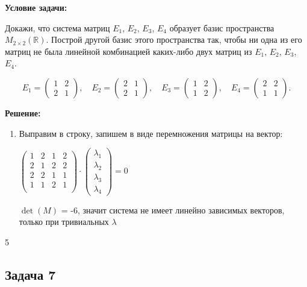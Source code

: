 \documentclass[a4paper,12pt]{article}
\begin{document}
\textbf{Условие задачи:}

Докажи, что система матриц $E_1$, $E_2$, $E_3$, $E_4$ образует базис пространства $M_{2 \times 2}(\mathbb{R})$. Построй другой базис этого пространства так, чтобы ни одна из его матриц не была линейной комбинацией каких-либо двух матриц из $E_1$, $E_2$, $E_3$, $E_4$.

\[
E_1 = \begin{pmatrix}1 & 2 \\ 2 & 1\end{pmatrix},\quad
E_2 = \begin{pmatrix}2 & 1 \\ 2 & 1\end{pmatrix},\quad
E_3 = \begin{pmatrix}1 & 2 \\ 1 & 2\end{pmatrix},\quad
E_4 = \begin{pmatrix}2 & 2 \\ 1 & 1\end{pmatrix}.
\]

\textbf{Решение:}
\begin{enumerate}
    \item Выправим в строку, запишем в виде перемножения матрицы на вектор: 
    
    $\begin{pmatrix}1 & 2 & 1 & 2\\
                    2 & 1 & 2 & 2\\
                    2 & 2 & 1 & 1\\
                    1 & 1 & 2 & 1\\\end{pmatrix} \cdot 
                    \begin{pmatrix}\lambda_1\\\lambda_2\\\lambda_3\\\lambda_4 \end{pmatrix}=0$

                    
    $\det(M)$ = -6, значит система не имеет линейно зависимых векторов, только при тривиальных $\lambda$
\end{enumerate}

\vspace{0.5cm}5

\subsection{Задача 7}
\end{document}
